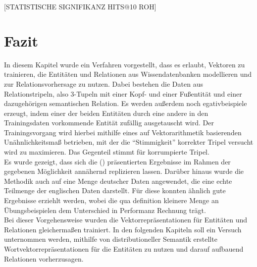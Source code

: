 [STATISTISCHE SIGNIFIKANZ HITS@10 ROH]

\section{Fazit}

In diesem Kapitel wurde ein Verfahren vorgestellt, dass es erlaubt, Vektoren zu trainieren, die Entitäten und Relationen
aus Wissendatenbanken modellieren und zur Relationsvorhersage zu nutzen. Dabei bestehen die Daten aus Relationstripeln,
also 3-Tupeln mit einer Kopf- und einer Fußentität und einer dazugehörigen semantischen Relation. Es werden außerdem noch
 egativbeispiele erzeugt, indem einer der beiden Entitäten durch eine andere in den Trainingsdaten vorkommende Entität zufällig ausgetauscht wird.
Der Trainingsvorgang wird hierbei mithilfe eines auf Vektorarithmetik basierenden Unähnlichkeitsmaß betrieben, mit der
die ``Stimmigkeit'' korrekter Tripel versucht wird zu maximieren. Das Gegenteil stimmt für korrumpierte Tripel.\\
Es wurde gezeigt, dass sich die (\cite{bordes2011learning}) präsentierten Ergebnisse im Rahmen der gegebenen Möglichkeit
annähernd replizieren lassen. Darüber hinaus wurde die Methodik auch auf eine Menge deutscher Daten angewendet, die eine
echte Teilmenge der englischen Daten darstellt. Für diese konnten ähnlich gute Ergebnisse erziehlt werden, wobei die qua
definition kleinere Menge an Übungsbeispielen dem Unterschied in Performanz Rechnung trägt.\\

Bei dieser Vorgehensweise wurden die Vektorrepräsentationen für Entitäten und Relationen gleichermaßen trainiert. In den folgenden
Kapiteln soll ein Versuch unternommen werden, mithilfe von distributioneller Semantik erstellte Wortvektorrepräsentationen
für die Entitäten zu nutzen und darauf aufbauend Relationen vorherzusagen.
